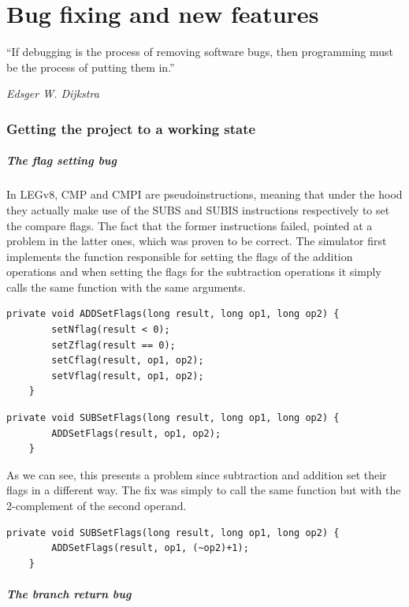 \chapter{Bug fixing and new features}\label{chap:chap3}

\epigraph{``If debugging is the process of removing software bugs, then programming must be the process of putting them in.''}{\textit{Edsger W. Dijkstra}}

\subsection*{Getting the project to a working state}

\paragraph*{The flag setting bug}

In LEGv8, CMP and CMPI are pseudoinstructions, meaning that under the hood they actually make use of the SUBS and SUBIS instructions respectively to set the compare flags. The fact that the former instructions failed, pointed at a problem in the latter ones, which was proven to be correct. The simulator first implements the function responsible for setting the flags of the addition operations and when setting the flags for the subtraction operations it simply calls the same function with the same arguments.
\begin{lstlisting}[caption={The adddition flag-setting code}]
	private void ADDSetFlags(long result, long op1, long op2) {
		setNflag(result < 0);
		setZflag(result == 0);
		setCflag(result, op1, op2);
		setVflag(result, op1, op2);
	}
\end{lstlisting}
\begin{lstlisting}[caption={The buggy subtraction flag-setting code}]
	private void SUBSetFlags(long result, long op1, long op2) {
		ADDSetFlags(result, op1, op2);
	}
\end{lstlisting}
As we can see, this presents a problem since subtraction and addition set their flags in a different way. The fix was simply to call the same function but with the 2-complement of the second operand.
\begin{lstlisting}[caption={The fixed subtraction flag-setting code}]
	private void SUBSetFlags(long result, long op1, long op2) {
		ADDSetFlags(result, op1, (~op2)+1);
	}
\end{lstlisting}

\paragraph*{The branch return bug}

